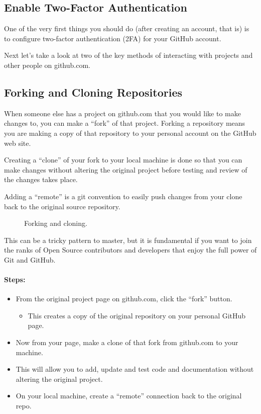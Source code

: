 \subsection{Enable Two-Factor Authentication}

\justify{}
One of the very first things you should do (after creating an account,
that is) is to configure two-factor authentication (2FA) for your GitHub account.

\justify{}
Next let's take a look at two of the key methods of interacting with projects and other people on github.com.

\subsection{Forking and Cloning Repositories}

\justify{}
When someone else has a project on github.com that you would like to make changes to,
you can make a ``fork'' of that project. Forking a repository means you
are making a copy of that repository to your personal account on the GitHub web site.

\justify{}
Creating a ``clone'' of your fork to your local machine is done so that
you can make changes without altering the original project before testing and review of the changes takes place.

\justify{}
Adding a ``remote'' is a git convention to easily push changes from your clone back to
the original source repository.

\begin{figure}[!htb]

\caption{Forking and cloning.}
\label{forkandclone}
\end{figure}

\justify{}
This can be a tricky pattern to master, but it is fundamental if you
want to join the ranks of Open Source contributors and developers that
enjoy the full power of Git and GitHub.

\paragraph{Steps:}

\begin{itemize}
      \item
            From the original project page on github.com, click the ``fork'' button.
            \begin{itemize}
                  \item
                        This creates a copy of the original repository on your personal
                        GitHub page.
            \end{itemize}
      \item
            Now from your page, make a clone of that fork from github.com to your
            machine.
      \item
            This will allow you to add, update and test code and documentation without altering the original project.
      \item
            On your local machine, create a ``remote'' connection back to the
            original repo.
\end{itemize}


